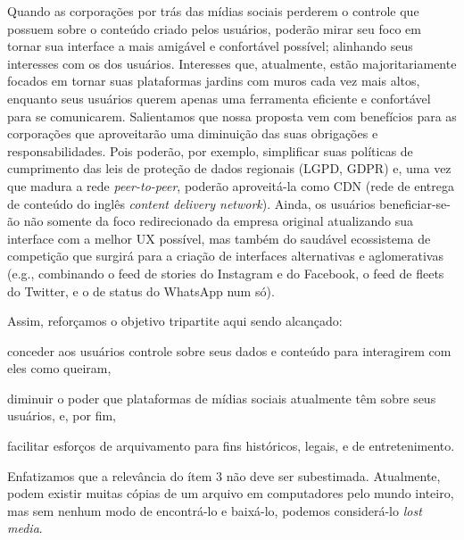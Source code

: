 Quando as corporações por trás das mídias sociais perderem o controle que possuem sobre o conteúdo criado pelos usuários, poderão mirar seu foco em tornar sua interface a mais amigável e confortável possível; alinhando seus interesses com os dos usuários.
Interesses que, atualmente, estão majoritariamente focados em tornar suas plataformas jardins com muros cada vez mais altos, enquanto seus usuários querem apenas uma ferramenta eficiente e confortável para se comunicarem.
Salientamos que nossa proposta vem com benefícios para as corporações que aproveitarão uma diminuição das suas obrigações e responsabilidades.
Pois poderão, por exemplo, simplificar suas políticas de cumprimento das leis de proteção de dados regionais (LGPD, GDPR) e, uma vez que madura a rede \textit{peer-to-peer}, poderão aproveitá-la como CDN (rede de entrega de conteúdo do inglês \textit{content delivery network}).
Ainda, os usuários beneficiar-se-ão não somente da foco redirecionado da empresa original atualizando sua interface com a melhor UX possível, mas também do saudável ecossistema de competição que surgirá para a criação de interfaces alternativas e aglomerativas (e.g., combinando o feed de stories do Instagram e do Facebook, o feed de fleets do Twitter, e o de status do WhatsApp num só).

Assim, reforçamos o objetivo tripartite aqui sendo alcançado:
\begin{enumerate*}[label=(\arabic*)]
    \item conceder aos usuários controle sobre seus dados e conteúdo para interagirem com eles como queiram,
    \item diminuir o poder que plataformas de mídias sociais atualmente têm sobre seus usuários, e, por fim,
    \item facilitar esforços de arquivamento para fins históricos, legais, e de entretenimento.
\end{enumerate*}
Enfatizamos que a relevância do ítem 3 não deve ser subestimada.
Atualmente, podem existir muitas cópias de um arquivo em computadores pelo mundo inteiro, mas sem nenhum modo de encontrá-lo e baixá-lo, podemos considerá-lo \textit{lost media}\footnotemark.

